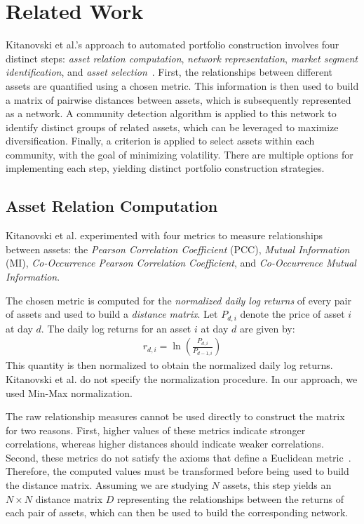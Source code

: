\documentclass[acmsmall,screen,nonacm]{acmart}
\begin{document}
\section{Related Work} \label{rel_work}

Kitanovski et al.’s approach to automated portfolio construction involves four distinct steps: \emph{asset relation computation}, \emph{network representation}, \emph{market segment identification}, and \emph{asset selection}~\cite{kitanovski}.
First, the relationships between different assets are quantified using a chosen metric.
This information is then used to build a matrix of pairwise distances between assets, which is subsequently represented as a network.
A community detection algorithm is applied to this network to identify distinct groups of related assets, which can be leveraged to maximize diversification.
Finally, a criterion is applied to select assets within each community, with the goal of minimizing volatility.
There are multiple options for implementing each step, yielding distinct portfolio construction strategies.

\subsection{Asset Relation Computation}

Kitanovski et al. experimented with four metrics to measure relationships between assets: the \emph{Pearson Correlation Coefficient} (PCC), \emph{Mutual Information} (MI), \emph{Co-Occurrence Pearson Correlation Coefficient}, and \emph{Co-Occurrence Mutual Information}.

The chosen metric is computed for the \emph{normalized daily log returns} of every pair of assets and used to build a \emph{distance matrix}.
Let $P_{d, i}$ denote the price of asset $i$ at day $d$.
The daily log returns for an asset $i$ at day $d$ are given by:
\begin{align}
    r_{d, i} = \ln\left(\frac{P_{d, i}}{P_{d-1, i}}\right)
\end{align}
This quantity is then normalized to obtain the normalized daily log returns.
Kitanovski et al. do not specify the normalization procedure.
In our approach, we used Min-Max normalization.

The raw relationship measures cannot be used directly to construct the matrix for two reasons.
First, higher values of these metrics indicate stronger correlations, whereas higher distances should indicate weaker correlations.
Second, these metrics do not satisfy the axioms that define a Euclidean metric~\cite{kitanovski, mantegna1999}.
Therefore, the computed values must be transformed before being used to build the distance matrix.
Assuming we are studying $N$ assets, this step yields an $N \times N$ distance matrix $D$ representing the relationships between the returns of each pair of assets, which can then be used to build the corresponding network.
\end{document}

